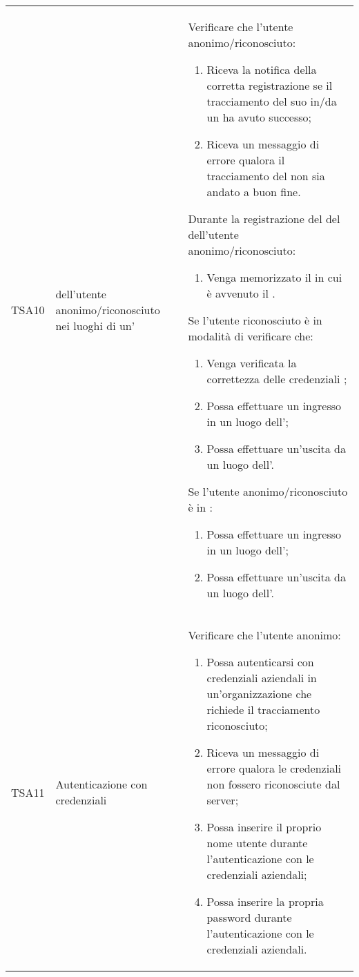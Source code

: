 {\begin{longtable}{ c  C{3cm}  C{11cm} }
TSA10 &  dell'utente anonimo/riconosciuto nei luoghi di un' &
Verificare che l'utente anonimo/riconosciuto:
\begin{enumerate}
    \item Riceva la notifica della corretta registrazione se il tracciamento del suo  in/da un  ha avuto successo;
    \item Riceva un messaggio di errore qualora il tracciamento del  non sia andato a buon fine.
\end{enumerate}
Durante la registrazione del  del  dell'utente anonimo/riconosciuto:
\begin{enumerate}
    \item Venga memorizzato il  in cui è avvenuto il .
\end{enumerate}
Se l'utente riconosciuto è in modalità di  verificare che:
\begin{enumerate}
    \item Venga verificata la correttezza delle credenziali ;
    \item Possa effettuare un ingresso in un luogo dell';
    \item Possa effettuare un'uscita da un luogo dell'.
\end{enumerate}
Se l'utente anonimo/riconosciuto è in :
\begin{enumerate}
    \item Possa effettuare un ingresso in un luogo dell';
    \item Possa effettuare un'uscita da un luogo dell'.
\end{enumerate} \\

TSA11 & Autenticazione con credenziali  &
Verificare che l'utente anonimo:
\begin{enumerate}
    \item Possa autenticarsi con credenziali aziendali in un'organizzazione che richiede il tracciamento riconosciuto;
    \item Riceva un messaggio di errore qualora le credenziali  non fossero riconosciute dal server;
    \item Possa inserire il proprio nome utente durante l'autenticazione con le credenziali  aziendali;
    \item Possa inserire la propria password durante l'autenticazione con le credenziali  aziendali.
\end{enumerate} \\


\end{longtable}}
